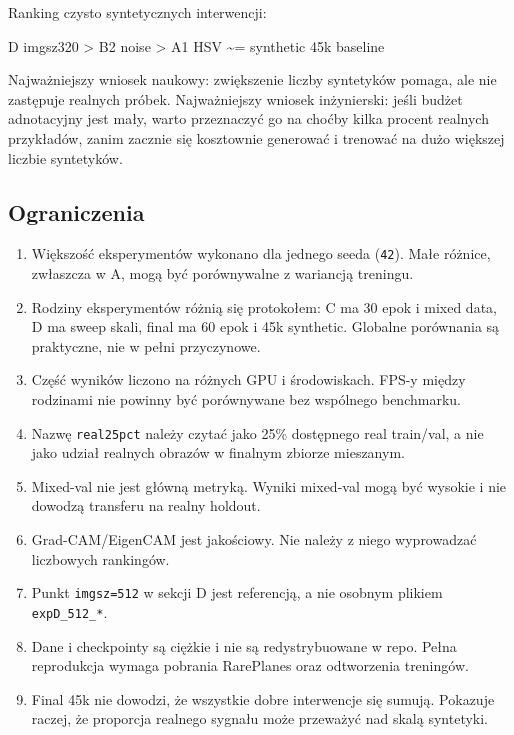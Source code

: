 \documentclass[
  11pt,
]{article}
\newenvironment{Shaded}{}{}
\newcommand{\NormalTok}[1]{#1}
\providecommand{\tightlist}{%
  \setlength{\itemsep}{0pt}\setlength{\parskip}{0pt}}
\begin{document}
Ranking czysto syntetycznych interwencji:

\begin{Shaded}
\begin{Highlighting}[]
\NormalTok{D imgsz320 \textgreater{} B2 noise \textgreater{} A1 HSV \textasciitilde{}= synthetic 45k baseline}
\end{Highlighting}
\end{Shaded}

Najważniejszy wniosek naukowy: zwiększenie liczby syntetyków pomaga, ale
nie zastępuje realnych próbek. Najważniejszy wniosek inżynierski: jeśli
budżet adnotacyjny jest mały, warto przeznaczyć go na choćby kilka
procent realnych przykładów, zanim zacznie się kosztownie generować i
trenować na dużo większej liczbie syntetyków.

\hypertarget{ograniczenia}{%
\subsection{Ograniczenia}\label{ograniczenia}}

\begin{enumerate}
\def\labelenumi{\arabic{enumi}.}
\tightlist
\item
  Większość eksperymentów wykonano dla jednego seeda (\texttt{42}). Małe
  różnice, zwłaszcza w A, mogą być porównywalne z wariancją treningu.
\item
  Rodziny eksperymentów różnią się protokołem: C ma 30 epok i mixed
  data, D ma sweep skali, final ma 60 epok i 45k synthetic. Globalne
  porównania są praktyczne, nie w pełni przyczynowe.
\item
  Część wyników liczono na różnych GPU i środowiskach. FPS-y między
  rodzinami nie powinny być porównywane bez wspólnego benchmarku.
\item
  Nazwę \texttt{real25pct} należy czytać jako 25\% dostępnego real
  train/val, a nie jako udział realnych obrazów w finalnym zbiorze
  mieszanym.
\item
  Mixed-val nie jest główną metryką. Wyniki mixed-val mogą być wysokie i
  nie dowodzą transferu na realny holdout.
\item
  Grad-CAM/EigenCAM jest jakościowy. Nie należy z niego wyprowadzać
  liczbowych rankingów.
\item
  Punkt \texttt{imgsz=512} w sekcji D jest referencją, a nie osobnym
  plikiem \texttt{expD\_512\_*}.
\item
  Dane i checkpointy są ciężkie i nie są redystrybuowane w repo. Pełna
  reprodukcja wymaga pobrania RarePlanes oraz odtworzenia treningów.
\item
  Final 45k nie dowodzi, że wszystkie dobre interwencje się sumują.
  Pokazuje raczej, że proporcja realnego sygnału może przeważyć nad
  skalą syntetyki.
\end{enumerate}
\end{document}
